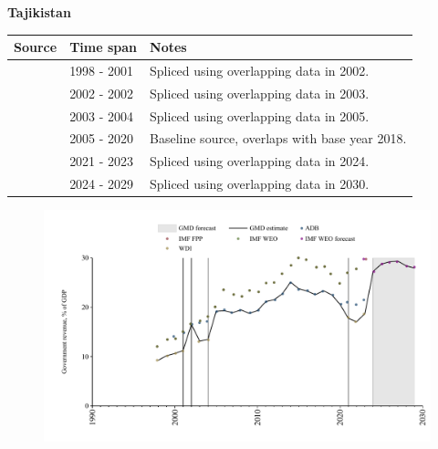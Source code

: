 \documentclass[12pt,a4paper,landscape]{article}
\begin{document}
\begin{adjustbox}{max totalsize={\paperwidth}{\paperheight},center}
\begin{minipage}[t][\textheight][t]{\textwidth}
\vspace*{0.5cm}
{}
\begin{center}
{\Large\bfseries Tajikistan}
\end{center}
\vspace{0.5cm}
\begin{table}[H]
\centering
\small
\begin{tabular}{|l|l|l|}
\hline
\textbf{Source} & \textbf{Time span} & \textbf{Notes} \\
\hline
\rowcolor{white}\cite{WDI}& 1998 - 2001 &Spliced using overlapping data in 2002.\\
\rowcolor{lightgray}\cite{ADB}& 2002 - 2002 &Spliced using overlapping data in 2003.\\
\rowcolor{white}\cite{WDI}& 2003 - 2004 &Spliced using overlapping data in 2005.\\
\rowcolor{lightgray}\cite{ADB}& 2005 - 2020 &Baseline source, overlaps with base year 2018.\\
\rowcolor{white}\cite{WDI}& 2021 - 2023 &Spliced using overlapping data in 2024.\\
\rowcolor{lightgray}\cite{IMF_WEO_forecast}& 2024 - 2029 &Spliced using overlapping data in 2030.\\
\hline
\end{tabular}
\end{table}
\begin{figure}[H]
\centering
\includegraphics[width=\textwidth,height=0.6\textheight,keepaspectratio]{graphs/TJK_govrev_GDP.pdf}
\end{figure}
\end{minipage}
\end{adjustbox}
\end{document}
